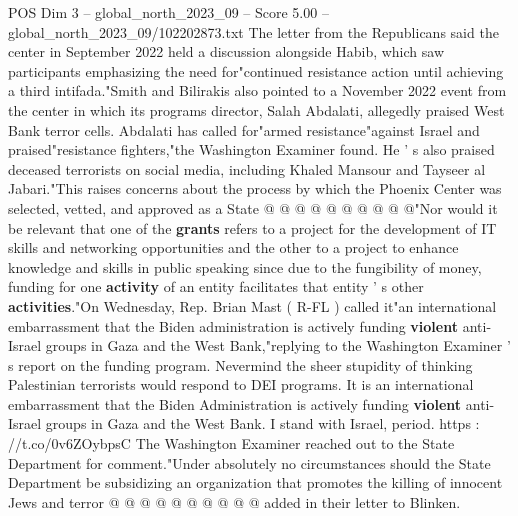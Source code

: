 \begin{textsample}{POS Dim 3 – global\_north\_2023\_09 – Score 5.00 – global\_north\_2023\_09/102202873.txt}
The letter from the Republicans said the center in September 2022 held a discussion alongside Habib, which saw participants emphasizing the need for"continued resistance action until achieving a third intifada."Smith and Bilirakis also pointed to a November 2022 event from the center in which its programs director, Salah Abdalati, allegedly praised West Bank terror cells.
Abdalati has called for"armed resistance"against Israel and praised"resistance fighters,"the Washington Examiner found.
He ' s also praised deceased terrorists on social media, including Khaled Mansour and Tayseer al Jabari."This raises concerns about the process by which the Phoenix Center was selected, vetted, and approved as a State @ @ @ @ @ @ @ @ @ @"Nor would it be relevant that one of the \textbf{grants} refers to a project for the development of IT skills and networking opportunities and the other to a project to enhance knowledge and skills in public speaking since due to the fungibility of money, funding for one \textbf{activity} of an entity facilitates that entity ' s other \textbf{activities}."On Wednesday, Rep.
Brian Mast ( R-FL ) called it"an international embarrassment that the Biden administration is actively funding \textbf{violent} anti-Israel groups in Gaza and the West Bank,"replying to the Washington Examiner ' s report on the funding program.
Nevermind the sheer stupidity of thinking Palestinian terrorists would respond to DEI programs.
It is an international embarrassment that the Biden Administration is actively funding \textbf{violent} anti-Israel groups in Gaza and the West Bank.
I stand with Israel, period. https : //t.co/0v6ZOybpsC The Washington Examiner reached out to the State Department for comment."Under absolutely no circumstances should the State Department be subsidizing an organization that promotes the killing of innocent Jews and terror @ @ @ @ @ @ @ @ @ @ added in their letter to Blinken.

\end{textsample}
